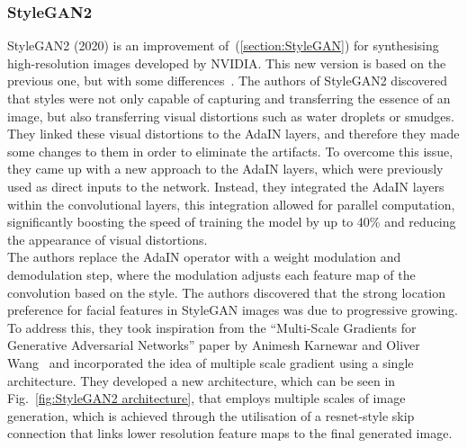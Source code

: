 \subsubsection{StyleGAN2}
\label{section:StyleGAN2}
StyleGAN2 (2020) is an improvement of~(\ref{section:StyleGAN}) for synthesising high-resolution images developed by NVIDIA. This new version is based on the previous one, but with some differences~\cite{Karras2019stylegan2}.
The authors of StyleGAN2 discovered that styles were not only capable of capturing and transferring the essence of an image, but also transferring visual distortions such as water droplets or smudges.
They linked these visual distortions to the AdaIN layers, and therefore they made some changes to them in order to eliminate the artifacts. To overcome this issue, they came up with a new approach to the AdaIN layers, which were previously used as direct inputs to the network. Instead, they integrated the AdaIN layers within the convolutional layers, this integration allowed for parallel computation, significantly boosting the speed of training the model by up to 40\% and reducing the appearance of visual distortions. \\
The authors replace the AdaIN operator with a weight modulation and demodulation step, where the modulation adjusts each feature map of the convolution based on the style. 
The authors discovered that the strong location preference for facial features in StyleGAN images was due to progressive growing. To address this, they took inspiration from the “Multi-Scale Gradients for Generative Adversarial Networks” paper by Animesh Karnewar and Oliver Wang~\cite{karnewar2019msg} and incorporated the idea of multiple scale gradient using a single architecture. They developed a new architecture, which can be seen in Fig.~\ref{fig:StyleGAN2 architecture}, that employs multiple scales of image generation, which is achieved through the utilisation of a resnet-style skip connection that links lower resolution feature maps to the final generated image.
